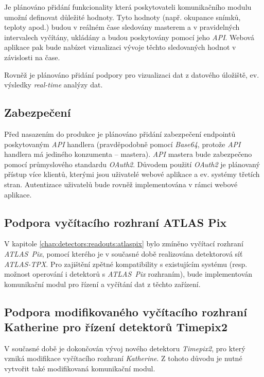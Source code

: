 Je plánováno přidání funkcionality která poskytovateli komunikačního modulu umožní definovat důležité hodnoty. Tyto hodnoty (např. okupance snímků, teploty apod.) budou v reálném čase sledovány masterem a v pravidelných intervalech vyčítány, ukládány a budou poskytovány pomocí jeho \textit{API}. Webová aplikace pak bude nabízet vizualizaci vývoje těchto sledovaných hodnot v závislosti na čase.

Rovněž je plánováno přidání podpory pro vizualizaci dat z datového úložiště, ev. výsledky \textit{real-time} analýzy dat.

\subsection{Zabezpečení}
Před nasazením do produkce je plánováno přidání zabezpečení endpointů poskytovaným \textit{API} handlera (pravděpodobně pomocí \textit{Base64}, protože \textit{API} handlera má jediného konzumenta -- mastera). \textit{API} mastera bude zabezpečeno pomocí průmyslového standardu \textit{OAuth2}. Důvodem použití \textit{OAuth2} je plánovaný přístup více klientů, kterými jsou uživatelé webové aplikace a ev. systémy třetích stran. Autentizace uživatelů bude rovněž implementována v rámci webové aplikace.

\subsection{Podpora vyčítacího rozhraní ATLAS Pix}
V kapitole \ref{chap:detectors:readouts:atlaspix} bylo zmíněno vyčítací rozhraní \textit{ATLAS~Pix}, pomocí kterého je v současné době realizována detektorová síť \textit{ATLAS-TPX}. Pro zajištění zpětné kompatibility s existujícím systému (resp. možnost operování i detektorů s \textit{ATLAS~Pix} rozhraním), bude implementován komunikační modul pro řízení a vyčítání dat z těchto zařízení.

\subsection{Podpora modifikovaného vyčítacího rozhraní Katherine pro řízení detektorů Timepix2}
V současné době je dokončován vývoj nového detektoru \textit{Timepix2}, pro který vzniká modifikace vyčítacího rozhraní \textit{Katherine}.
Z tohoto důvodu je nutné vytvořit také modifikovaná komunikační modul.
